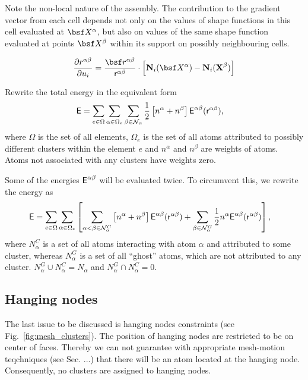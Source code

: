 \documentclass[a4paper,10pt]{article}
\newcommand{\reffig}[1]{Fig.~\ref{fig:#1}}
\def\gz  #1{           \mbox{$\mathbf{#1}$}}
\def\msf  #1{           \mbox{\!\!      $\sf #1$}}
\def\mcl  #1{               {\cal #1}}
\begin{document}
Note the non-local nature of the assembly. The contribution to the gradient vector from each cell depends not only on the values of shape functions in this cell evaluated at $\bsf X^\alpha$, but also on values of the same shape function evaluated at points $\bsf X^\beta$ within its support on possibly neighbouring cells.

\begin{align}
\frac{\partial r^{\alpha\beta}}{\partial u_i} = \frac{\bsf r^{\alpha\beta}}{\msf r^{\alpha\beta}} \cdot \left[\gz N_i (\bsf X^\alpha) - \gz N_i (\gz X^\beta) \right]
\end{align}


Rewrite the total energy in the equivalent form
\begin{align}
\msf E &= \sum_{e \in \Omega} \sum_{\alpha \in \Omega_e} \sum_{\beta \in \mcl N_\alpha} \frac{1}{2} \left[n^\alpha + n^\beta\right] \msf E^{\alpha \beta} (\msf r^{\alpha\beta}),
\end{align}
where $\Omega$ is the set of all elements, $\Omega_e$ is the set of all atoms attributed to possibly different clusters within the element $e$ and $n^\alpha$ and $n^\beta$ are weights of atoms. Atoms not associated with any clusters have weights zero.


Some of the energies $\msf E^{\alpha\beta}$ will be evaluated twice. To circumvent this, we rewrite the energy as
\begin{align}
\msf E &= \sum_{e \in \Omega} \sum_{\alpha \in \Omega_e}
\left[
\sum_{\alpha < \beta \in \mcl N_\alpha^C} \left[n^\alpha + n^\beta\right] \msf E^{\alpha \beta} (\msf r^{\alpha\beta})
+
\sum_{\beta \in \mcl N_\alpha^G} \frac{1}{2} n^\alpha \msf E^{\alpha \beta} (\msf r^{\alpha\beta})
\right],
\end{align}
where $N_\alpha^C$ is a set of all atoms interacting with atom $\alpha$ and attributed to some cluster, whereas
$N_\alpha^G$ is a set of all ``ghost'' atoms, which are not attributed to any cluster.
$N_\alpha^G \cup N_\alpha^C = N_\alpha$ and $N_\alpha^G \cap N_\alpha^C =  0$.

\subsection{Hanging nodes}

The last issue to be discussed is hanging nodes constraints (see \reffig{mesh_clusters}). The position of hanging nodes are restricted to
be on center of faces. Thereby we can not guarantee with appropriate mesh-motion teqchniques (see Sec. ...) that there will be an atom
located at the hanging node. Consequently, no clusters are assigned to hanging nodes.
\end{document}

